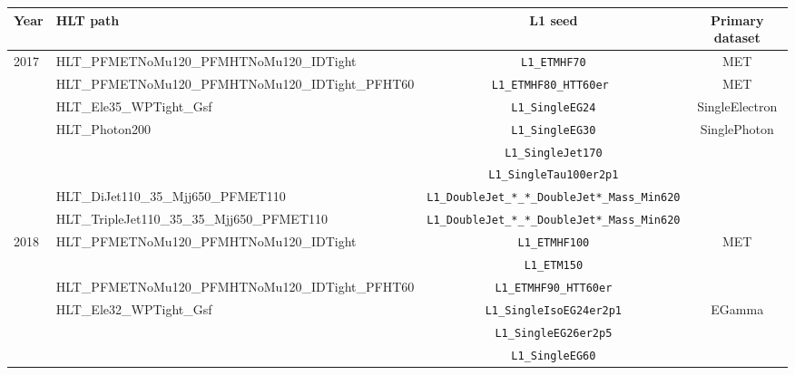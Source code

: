 \begin{table}
    \footnotesize
    \begin{tabular}{l l c c}
        \hline\hline
        Year                   & HLT path                                                  & L1 seed                         & Primary dataset               \\\hline\hline
        \multirow{5}{*}{2017}  & HLT\_PFMETNoMu120\_PFMHTNoMu120\_IDTight                  & \texttt{L1\_ETMHF70}            & MET                           \\
                               & HLT\_PFMETNoMu120\_PFMHTNoMu120\_IDTight\_PFHT60          & \texttt{L1\_ETMHF80\_HTT60er }  & MET                           \\\cline{2-4}
                               & HLT\_Ele35\_WPTight\_Gsf                                  & \texttt{L1\_SingleEG24}         & SingleElectron                \\\cline{2-4}
                               & \multirow{3}{*}{HLT\_Photon200}                           & \texttt{L1\_SingleEG30}         & \multirow{3}{*}{SinglePhoton} \\
                               &                                                           & \texttt{L1\_SingleJet170}       &                               \\
                               &                                                           & \texttt{L1\_SingleTau100er2p1}  &                               \\\cline{2-4}
                               & HLT\_DiJet110\_35\_Mjj650\_PFMET110                       & \texttt{L1\_DoubleJet\_*\_*\_DoubleJet*\_Mass\_Min620}       &        \\\cline{2-4}
                               & HLT\_TripleJet110\_35\_35\_Mjj650\_PFMET110               & \texttt{L1\_DoubleJet\_*\_*\_DoubleJet*\_Mass\_Min620}       &
                               \\\hline\hline

        \multirow{11}{*}{2018} & \multirow{2}{*}{HLT\_PFMETNoMu120\_PFMHTNoMu120\_IDTight} & \texttt{L1\_ETMHF100}           & \multirow{3}{*}{MET}          \\
                               &                                                           & \texttt{L1\_ETM150}             &                               \\
                               & HLT\_PFMETNoMu120\_PFMHTNoMu120\_IDTight\_PFHT60          & \texttt{L1\_ETMHF90\_HTT60er}   &                               \\\cline{2-4}
                               & \multirow{3}{*}{HLT\_Ele32\_WPTight\_Gsf}                 & \texttt{L1\_SingleIsoEG24er2p1} & \multirow{3}{*}{EGamma}       \\
                               &                                                           & \texttt{L1\_SingleEG26er2p5}    &                               \\
                               &                                                           & \texttt{L1\_SingleEG60}         &                               \\\cline{2-4}


\end{tabular}
\end{table}
